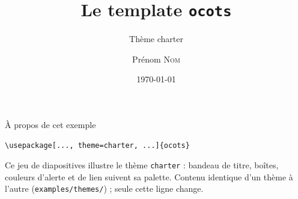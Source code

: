 \documentclass[9pt,t]{beamer}
\title{Le template \texttt{ocots}}
\subtitle{Th\`eme charter}
\author{Prénom \textsc{Nom}}
\date{\today}
\begin{document}
\slidetitlepage%

\begin{frame}[fragile]{\`A propos de cet exemple}
\begin{lstlisting}
\usepackage[..., theme=charter, ...]{ocots}
\end{lstlisting}
Ce jeu de diapositives illustre le th\`eme \texttt{charter} : bandeau de
titre, bo\^ites, couleurs d'alerte et de lien suivent sa palette. Contenu
identique d'un th\`eme \`a l'autre (\texttt{examples/themes/}) ; seule
cette ligne change.
\end{frame}


\end{document}
